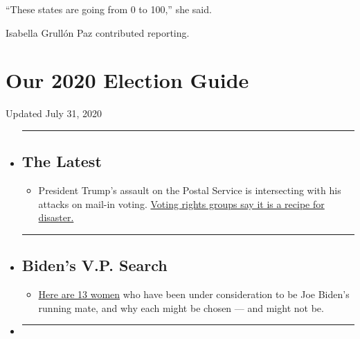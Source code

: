 ``These states are going from 0 to 100,'' she said.

Isabella Grullón Paz contributed reporting.

\hypertarget{our-2020-election-guide}{%
\section{Our 2020 Election Guide}\label{our-2020-election-guide}}

Updated July 31, 2020

\begin{itemize}
\item
  \begin{center}\rule{0.5\linewidth}{\linethickness}\end{center}

  \hypertarget{the-latest}{%
  \subsection{The Latest}\label{the-latest}}

  \begin{itemize}
  \tightlist
  \item
    President Trump's assault on the Postal Service is intersecting with
    his attacks on mail-in voting.
    \href{https://www.nytimes.com/2020/07/31/us/politics/trump-usps-mail-delays.html?action=click\&pgtype=Article\&state=default\&region=BELOW_MAIN_CONTENT\&context=storylines_guide}{Voting
    rights groups say it is a recipe for disaster.}
  \end{itemize}
\item
  \begin{center}\rule{0.5\linewidth}{\linethickness}\end{center}

  \hypertarget{bidens-vp-search}{%
  \subsection{Biden's V.P. Search}\label{bidens-vp-search}}

  \begin{itemize}
  \tightlist
  \item
    \href{https://www.nytimes.com/article/biden-vice-president-2020.html?action=click\&pgtype=Article\&state=default\&region=BELOW_MAIN_CONTENT\&context=storylines_guide}{Here
    are 13 women} who have been under consideration to be Joe Biden's
    running mate, and why each might be chosen --- and might not be.
  \end{itemize}
\item
  \begin{center}\rule{0.5\linewidth}{\linethickness}\end{center}


\end{itemize}
